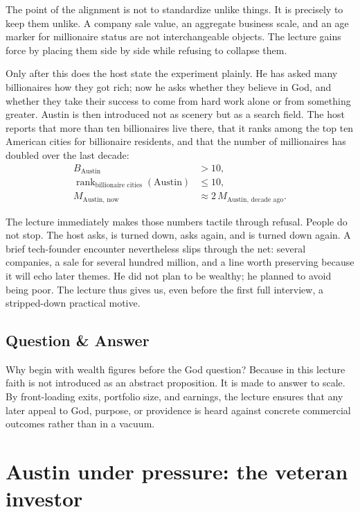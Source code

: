 The point of the alignment is not to standardize unlike things. It is precisely to keep them unlike. A company sale value, an aggregate business scale, and an age marker for millionaire status are not interchangeable objects. The lecture gains force by placing them side by side while refusing to collapse them.

Only after this does the host state the experiment plainly. He has asked many billionaires how they got rich; now he asks whether they believe in God, and whether they take their success to come from hard work alone or from something greater. Austin is then introduced not as scenery but as a search field. The host reports that more than ten billionaires live there, that it ranks among the top ten American cities for billionaire residents, and that the number of millionaires has doubled over the last decade:
\begin{align}
B_{\text{Austin}} &> 10,\\
\operatorname{rank}_{\text{billionaire cities}}(\text{Austin}) &\le 10,\\
M_{\text{Austin, now}} &\approx 2\,M_{\text{Austin, decade ago}}.
\end{align}

The lecture immediately makes those numbers tactile through refusal. People do not stop. The host asks, is turned down, asks again, and is turned down again. A brief tech-founder encounter nevertheless slips through the net: several companies, a sale for several hundred million, and a line worth preserving because it will echo later themes. He did not plan to be wealthy; he planned to avoid being poor. The lecture thus gives us, even before the first full interview, a stripped-down practical motive.

\subsection{Question \& Answer}

Why begin with wealth figures before the God question? Because in this lecture faith is not introduced as an abstract proposition. It is made to answer to scale. By front-loading exits, portfolio size, and earnings, the lecture ensures that any later appeal to God, purpose, or providence is heard against concrete commercial outcomes rather than in a vacuum.

\section{Austin under pressure: the veteran investor}

